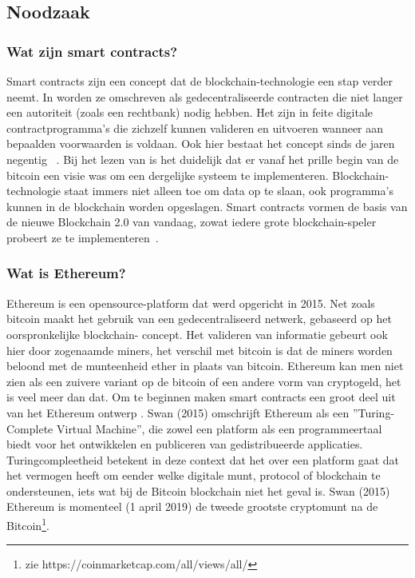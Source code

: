 	\subsection{Noodzaak}
		\subsubsection{Wat  zijn smart contracts?}
			Smart contracts zijn een concept dat de blockchain-technologie een stap verder neemt. In \textcite{Swan2015} worden ze omschreven als gedecentraliseerde contracten die niet langer een autoriteit (zoals een rechtbank) nodig hebben. Het zijn in feite digitale contractprogramma’s die zichzelf kunnen valideren en uitvoeren wanneer aan bepaalden voorwaarden is voldaan. Ook hier bestaat het concept sinds de jaren negentig ~\autocite{Szabo1996}. Bij het lezen van \textcite{Nakamoto2008} is het duidelijk dat er vanaf het prille begin van de bitcoin een visie was om een dergelijke systeem te implementeren. Blockchain-technologie staat immers niet alleen toe om data op te slaan, ook programma’s kunnen in de blockchain worden opgeslagen. Smart contracts vormen de basis van de nieuwe Blockchain 2.0 van vandaag, zowat iedere grote blockchain-speler probeert ze te implementeren~\autocite{Swan2015}.
		\subsubsection{Wat is Ethereum?}
			Ethereum is een opensource-platform dat werd opgericht in 2015. Net zoals bitcoin maakt het gebruik van een gedecentraliseerd netwerk, gebaseerd op het oorspronkelijke blockchain- concept. Het valideren van informatie gebeurt ook hier door zogenaamde miners, het verschil met bitcoin is dat de miners worden beloond met de munteenheid ether in plaats van bitcoin. Ethereum kan men niet zien als een zuivere variant op de bitcoin of een andere vorm van cryptogeld, het is veel meer dan dat. Om te beginnen maken smart contracts  een groot deel uit van het Ethereum ontwerp . Swan (2015) omschrijft Ethereum als een ”Turing-Complete Virtual Machine”, die zowel een platform als een programmeertaal biedt voor het ontwikkelen en publiceren van gedistribueerde applicaties. Turingcompleetheid betekent in deze context dat het over een platform gaat dat het vermogen heeft om eender welke digitale munt, protocol of blockchain te ondersteunen, iets wat bij de Bitcoin blockchain niet het geval is. Swan (2015)  Ethereum is momenteel (1 april 2019) de tweede grootste cryptomunt na de Bitcoin\footnote{zie https://coinmarketcap.com/all/views/all/}. 
			
